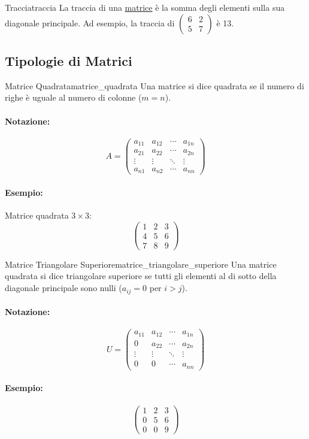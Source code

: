 \documentclass{article}
\begin{document}
\begin{definition}{Traccia}{traccia}
    La traccia di una \hyperref[def:matrice]{matrice} è la somma degli elementi sulla sua diagonale principale. Ad esempio, la traccia di $\begin{pmatrix} 6 & 2 \\ 5 & 7 \end{pmatrix}$ è 13.
\end{definition}

\subsection{Tipologie di Matrici}

\begin{definition}{Matrice Quadrata}{matrice_quadrata}
Una matrice si dice quadrata se il numero di righe è uguale al numero di colonne ($m=n$).
\paragraph{Notazione:}
\[ A = \begin{pmatrix}
a_{11} & a_{12} & \cdots & a_{1n} \\
a_{21} & a_{22} & \cdots & a_{2n} \\
\vdots & \vdots & \ddots & \vdots \\
a_{n1} & a_{n2} & \cdots & a_{nn}
\end{pmatrix} \]
\paragraph{Esempio:} Matrice quadrata $3 \times 3$:
\[ \begin{pmatrix}
1 & 2 & 3 \\
4 & 5 & 6 \\
7 & 8 & 9
\end{pmatrix} \]
\end{definition}

\begin{definition}{Matrice Triangolare Superiore}{matrice_triangolare_superiore}
Una matrice quadrata si dice triangolare superiore se tutti gli elementi al di sotto della diagonale principale sono nulli ($a_{ij} = 0$ per $i>j$).
\paragraph{Notazione:}
\[ U = \begin{pmatrix}
a_{11} & a_{12} & \cdots & a_{1n} \\
0 & a_{22} & \cdots & a_{2n} \\
\vdots & \vdots & \ddots & \vdots \\
0 & 0 & \cdots & a_{nn}
\end{pmatrix} \]
\paragraph{Esempio:}
\[ \begin{pmatrix}
1 & 2 & 3 \\
0 & 5 & 6 \\
0 & 0 & 9
\end{pmatrix} \]
\end{definition}
\end{document}

